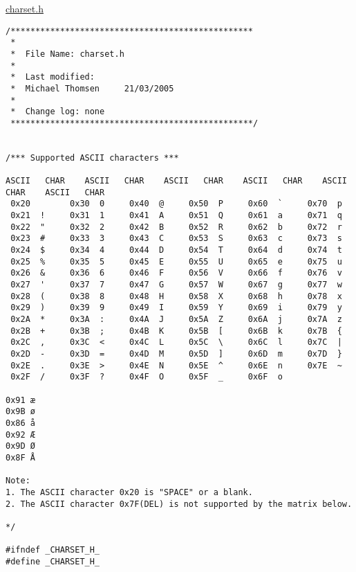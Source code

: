 \underline{charset.h}
\begin{lstlisting}
/*************************************************
 *
 *  File Name: charset.h
 *
 *  Last modified:
 *  Michael Thomsen     21/03/2005
 *
 * 	Change log: none
 *************************************************/


/*** Supported ASCII characters ***

ASCII	CHAR	ASCII	CHAR	ASCII	CHAR	ASCII	CHAR	ASCII	CHAR	ASCII	CHAR
 0x20        0x30  0     0x40  @     0x50  P     0x60  `     0x70  p		
 0x21  !     0x31  1     0x41  A     0x51  Q     0x61  a     0x71  q		
 0x22  "     0x32  2     0x42  B     0x52  R     0x62  b     0x72  r
 0x23  #     0x33  3     0x43  C     0x53  S     0x63  c     0x73  s
 0x24  $     0x34  4     0x44  D     0x54  T     0x64  d     0x74  t
 0x25  %     0x35  5     0x45  E     0x55  U     0x65  e     0x75  u
 0x26  &     0x36  6     0x46  F     0x56  V     0x66  f     0x76  v
 0x27  '     0x37  7     0x47  G     0x57  W     0x67  g     0x77  w		
 0x28  (     0x38  8     0x48  H     0x58  X     0x68  h     0x78  x	
 0x29  )     0x39  9     0x49  I     0x59  Y     0x69  i     0x79  y
 0x2A  *     0x3A  :     0x4A  J     0x5A  Z     0x6A  j     0x7A  z
 0x2B  +     0x3B  ;     0x4B  K     0x5B  [     0x6B  k     0x7B  {
 0x2C  ,     0x3C  <     0x4C  L     0x5C  \     0x6C  l     0x7C  |
 0x2D  -     0x3D  =     0x4D  M     0x5D  ]     0x6D  m     0x7D  }
 0x2E  .     0x3E  >     0x4E  N     0x5E  ^     0x6E  n     0x7E  ~
 0x2F  /     0x3F  ?     0x4F  O     0x5F  _     0x6F  o
 
0x91 æ
0x9B ø
0x86 å
0x92 Æ
0x9D Ø
0x8F Å

Note: 
1. The ASCII character 0x20 is "SPACE" or a blank.
2. The ASCII character 0x7F(DEL) is not supported by the matrix below.

*/

#ifndef _CHARSET_H_
#define _CHARSET_H_


\end{lstlisting}
